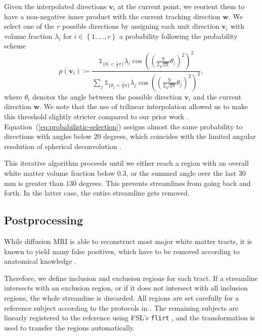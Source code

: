 Given the interpolated directions $\mathbf{v}_i$ at the current point, we
reorient them to have a non-negative inner product with the current tracking
direction $\mathbf{w}$. We select one of the $r$ possible directions by assigning each unit direction $\mathbf{v}_i$ with volume fraction
$\lambda_i$ for $i \in \left\{ 1 , \dots , r \right\}$ a probability following the probability
scheme
\begin{equation}
  \label{eq:probabilistic-selection}
	p \left( \mathbf{v}_i \right) \coloneqq \frac{ \mathbb{1}_{\lbrace\theta_i <
		\frac{1}{4} \pi \rbrace} \lambda_i \cos \left( \left( \frac{9}{2\sqrt{2
\pi}} \theta_i \right)^2 \right)^2}{\sum_j \mathbb{1}_{\lbrace\theta_j <
		\frac{1}{4} \pi \rbrace} \lambda_j \cos \left( \left( \frac{9}{2\sqrt{2
\pi}} \theta_j \right)^2 \right)^2 },   
\end{equation}
where $\theta_i$ denotes the angle between the possible direction $\mathbf{v}_i$
and the current direction $\mathbf{w}$.  We note that the use of trilinear interpolation allowed us to make this threshold slightly stricter compared to our prior work \cite{Gruen:2021}.
%
Equation~(\ref{eq:probabilistic-selection}) assigns almost the same probability to directions with angles below 20 degrees, which coincides with the limited angular resolution of
spherical deconvolution \cite{TOURNIER20071459}. 

This iterative algorithm proceeds until we either reach a region with an overall white matter volume fraction below $0.3$, or the summed angle over the last $30$ mm is greater than
$130$ degrees. This prevents streamlines from going back and forth. In the latter case,
the entire streamline gets removed. 

\subsection{Postprocessing}
\label{sec:postprocessing}
While diffusion MRI is able to reconstruct most major white
matter tracts, it is known to yield many false
positives, which have to be removed according to anatomical knowledge
\cite{MaierHein:2017}. %

Therefore, we define inclusion and exclusion regions for each tract. If a streamline intersects with an exclusion region, or if it  does not intersect with all inclusion regions, the whole streamline is discarded. All regions
are set carefully for a reference subject according to the protocols in
\cite{Wakana:2007}.
The remaining subjects are linearly registered to the reference using FSL's \texttt{flirt} \cite{FSL}, and the transformation is used to transfer the regions automatically.

